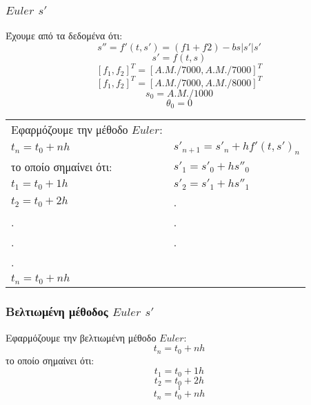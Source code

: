 \documentclass[a4paper]{article}
\begin{document}
        
        \subsubsection*{$Euler$ $s'$}
        Έχουμε από τα δεδομένα ότι:
        \begin{equation}
            s''=f'(t,s')=(f1+f2)-bs|s'|s'
        \end{equation}
        \begin{equation}
            s'=f(t,s)
        \end{equation}
        \[{[f_1,f_2]}^T={[A.M./7000, A.M./7000]}^T\]
        \[{[f_1,f_2]}^T={[A.M./7000, A.M./8000]}^T\]
        \[s_0=A.M./1000\]
        \[\theta_0=0\]
        

            \begin{tabular}{ll}
            Εφαρμόζουμε την μέθοδο $Euler$:                              &                               \\
            $t_n=t_0+nh$       & $s'_{n+1}=s'_n+hf'(t,s')_n$ \\
            το οποίο σημαίνει ότι:                                       & $s'_1=s'_0+hs''_0$    \\
            $t_1=t_0+1h$                                               & $s'_2=s'_1+hs''_1$    \\
            $t_2=t_0+2h$                                               & .                   \\
            .                                                        & .                   \\
            .                                                        & .                   \\
            .                                                        &                         \\
            $t_n=t_0+nh$                                               &                         
            \end{tabular}





        \subsubsection*{Bελτιωμένη μέθοδος $Euler$ $s'$}
        Εφαρμόζουμε την βελτιωμένη μέθοδο $Euler$:
        \[t_n=t_0+nh\]
        το οποίο σημαίνει ότι:
        \[t_1=t_0+1h\]
        \[t_2=t_0+2h\]
        \[.\]
        \[.\]
        \[.\]
        \[t_n=t_0+nh\]
\end{document}
